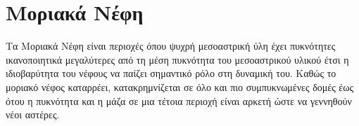 %


\section{Μοριακά Νέφη}
Τα Μοριακά Νέφη είναι περιοχές όπου ψυχρή μεσοαστρική ύλη έχει πυκνότητες ικανοποιητικά μεγαλύτερες από τη μέση πυκνότητα του μεσοαστρικού υλικού έτσι η ιδιοβαρύτητα του νέφους να παίζει σημαντικό ρόλο στη δυναμική του. Καθώς το μοριακό νέφος καταρρέει, κατακρημνίζεται σε όλο και πιο συμπυκνωμένες δομές έως ότου η πυκνότητα και η μάζα σε μια τέτοια περιοχή είναι αρκετή ώστε να γεννηθούν νέοι αστέρες.   

